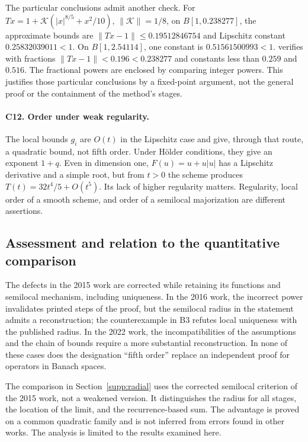 \documentclass[11pt,a4paper]{article}
\numberwithin{equation}{section}
\numberwithin{table}{section}
\theoremstyle{plain}
\theoremstyle{definition}\newtheorem{definition}[theorem]{Definition}
\theoremstyle{remark}\newtheorem{remark}[theorem]{Remark}
\begin{document}
The particular conclusions admit another check. For
$Tx=1+\mathcal K(|x|^{8/5}+x^2/10)$, $\|\mathcal K\|=1/8$,
on $B[1,0.238277]$, the approximate bounds are
$\|Tx-1\|\leq0.19512846754$ and Lipschitz constant $0.25832039011<1$.
On $B[1,2.54114]$, one constant is $0.51561500993<1$.
 verifies with fractions
$\|Tx-1\|<0.196<0.238277$ and constants less than $0.259$ and $0.516$.
The fractional powers are enclosed by comparing integer powers.
This justifies those particular conclusions by a fixed-point argument,
not the general proof or the containment of the method's stages.

\paragraph{C12. Order under weak regularity.}
The local bounds $g_i$ are $O(t)$ in the Lipschitz case and give,
through that route, a quadratic bound, not fifth order. Under
H\"older conditions, they give an exponent $1+q$. Even in dimension
one, $F(u)=u+u|u|$ has a Lipschitz derivative and a simple root, but
from $t>0$ the scheme produces $T(t)=32t^4/5+O(t^5)$.
Its lack of higher regularity matters. Regularity, local order of
a smooth scheme, and order of a semilocal majorization are different
assertions.

\subsection{Assessment and relation to the quantitative comparison}
The defects in the 2015 work are corrected while retaining its
functions and semilocal mechanism, including uniqueness. In the
2016 work, the incorrect power invalidates printed steps of the
proof, but the semilocal radius in the statement admits a
reconstruction; the counterexample in B3 refutes local uniqueness
with the published radius. In the 2022 work, the incompatibilities
of the assumptions and the chain of bounds require a more substantial
reconstruction. In none of these cases does the designation
``fifth order'' replace an independent proof for operators in
Banach spaces.

The comparison in Section~\ref{supp:radial} uses
the corrected semilocal criterion of the 2015 work, not a weakened
version. It distinguishes the radius for all stages, the location
of the limit, and the recurrence-based sum. The advantage is proved
on a common quadratic family and is not inferred from errors found
in other works. The analysis is limited to the results examined here.
\end{document}
